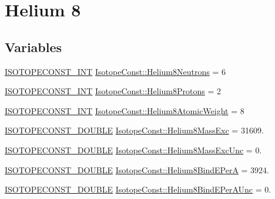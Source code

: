 \hypertarget{group___isotope_const-_helium-_he8}{}\section{Helium 8}
\label{group___isotope_const-_helium-_he8}
\subsection*{Variables}
\begin{DoxyCompactItemize}
\item 
\mbox{\hyperlink{group___isotope_const-_macros_ga5f18360b3e99483a35c32d789e62621c}{I\+S\+O\+T\+O\+P\+E\+C\+O\+N\+S\+T\+\_\+\+I\+NT}} \mbox{\hyperlink{group___isotope_const-_helium-_he8_gaa5fde639f1fcda867316caf80d8cc8f9}{Isotope\+Const\+::\+Helium8\+Neutrons}} = 6
\item 
\mbox{\hyperlink{group___isotope_const-_macros_ga5f18360b3e99483a35c32d789e62621c}{I\+S\+O\+T\+O\+P\+E\+C\+O\+N\+S\+T\+\_\+\+I\+NT}} \mbox{\hyperlink{group___isotope_const-_helium-_he8_ga6acc7f54da00712859050d8fc1df99df}{Isotope\+Const\+::\+Helium8\+Protons}} = 2
\item 
\mbox{\hyperlink{group___isotope_const-_macros_ga5f18360b3e99483a35c32d789e62621c}{I\+S\+O\+T\+O\+P\+E\+C\+O\+N\+S\+T\+\_\+\+I\+NT}} \mbox{\hyperlink{group___isotope_const-_helium-_he8_ga83b93681c2e2c98433b1160930086e81}{Isotope\+Const\+::\+Helium8\+Atomic\+Weight}} = 8
\item 
\mbox{\hyperlink{group___isotope_const-_macros_ga8f45a7272ce02c0b4c65c44636ed719a}{I\+S\+O\+T\+O\+P\+E\+C\+O\+N\+S\+T\+\_\+\+D\+O\+U\+B\+LE}} \mbox{\hyperlink{group___isotope_const-_helium-_he8_gababfcb58ec855af21efd7c839e92f45d}{Isotope\+Const\+::\+Helium8\+Mass\+Exc}} = 31609.
\item 
\mbox{\hyperlink{group___isotope_const-_macros_ga8f45a7272ce02c0b4c65c44636ed719a}{I\+S\+O\+T\+O\+P\+E\+C\+O\+N\+S\+T\+\_\+\+D\+O\+U\+B\+LE}} \mbox{\hyperlink{group___isotope_const-_helium-_he8_ga19bbac85bafb8580f7cef1f549d32dc5}{Isotope\+Const\+::\+Helium8\+Mass\+Exc\+Unc}} = 0.
\item 
\mbox{\hyperlink{group___isotope_const-_macros_ga8f45a7272ce02c0b4c65c44636ed719a}{I\+S\+O\+T\+O\+P\+E\+C\+O\+N\+S\+T\+\_\+\+D\+O\+U\+B\+LE}} \mbox{\hyperlink{group___isotope_const-_helium-_he8_gaa8b0ea973a8b9dd8c9b2e6241b03400e}{Isotope\+Const\+::\+Helium8\+Bind\+E\+PerA}} = 3924.
\item 
\mbox{\hyperlink{group___isotope_const-_macros_ga8f45a7272ce02c0b4c65c44636ed719a}{I\+S\+O\+T\+O\+P\+E\+C\+O\+N\+S\+T\+\_\+\+D\+O\+U\+B\+LE}} \mbox{\hyperlink{group___isotope_const-_helium-_he8_ga5d45fa98b16d4fa7d02fa718a5260ff0}{Isotope\+Const\+::\+Helium8\+Bind\+E\+Per\+A\+Unc}} = 0.

\end{DoxyCompactItemize}

